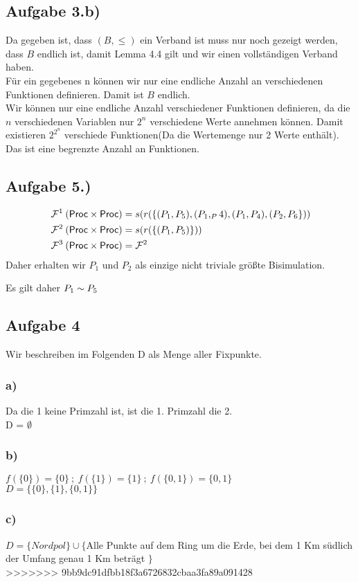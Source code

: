 \documentclass[10pt,a4paper,german,landscape,fleqn]{article} \usepackage[utf8]{inputenc} %
\begin{document}
\subsection*{Aufgabe 3.b)}
Da gegeben ist, dass $(B,\le)$ ein Verband ist muss nur noch gezeigt werden, dass
$B$ endlich ist, damit Lemma 4.4 gilt und wir einen vollständigen Verband haben. \\
Für ein gegebenes n können wir nur eine endliche Anzahl an verschiedenen Funktionen definieren. Damit ist $B$ endlich. \\
Wir können nur eine endliche Anzahl verschiedener Funktionen definieren, da die $n$ verschiedenen Variablen nur $2^n$ verschiedene Werte annehmen können. Damit existieren $2^{2^n}$ verschiede Funktionen(Da die Wertemenge nur 2 Werte enthält). Das ist eine begrenzte Anzahl an Funktionen.
\newpage

\subsection*{Aufgabe 5.)}
\begin{align}
&\mathbin{\mathcal{F}}^1(\mbox{\sf Proc} \times \mbox{\sf Proc}) = s(r(\{(P_1,P_5),(P_1,_P4),(P_1,P_4),(P_2,P_6\})) \\
&\mathbin{\mathcal{F}}^2(\mbox{\sf Proc} \times \mbox{\sf Proc}) = s(r(\{(P_1,P_5)\})) \\
&\mathbin{\mathcal{F}}^3(\mbox{\sf Proc} \times \mbox{\sf Proc}) = \mathbin{\mathcal{F}}^2 \\
\end{align}
Daher erhalten wir $P_1$ und $P_2$ als einzige nicht triviale größte Bisimulation.

Es gilt daher $P_1 \sim P_5$

\subsection*{Aufgabe 4}
Wir beschreiben im Folgenden D als Menge aller Fixpunkte.
\subsubsection*{a)}
Da die 1 keine Primzahl ist, ist die 1. Primzahl die 2.\\
D = $\emptyset$
\subsubsection*{b)}
$f(\{0\})=\{0\} \ ; \ f(\{1\})=\{1\} \ ; \ f(\{0,1\})=\{0,1\}$\\
$D=\{ \{0\},\{1\},\{0,1\}\}$\\
\subsubsection*{c)}
$D=\{Nordpol\} \cup \{$Alle Punkte auf dem Ring um die Erde, bei dem 1 Km südlich der Umfang genau 1 Km beträgt $\} $\\
>>>>>>> 9bb9dc91dfbb18f3a6726832cbaa3fa89a091428
\end{document}
